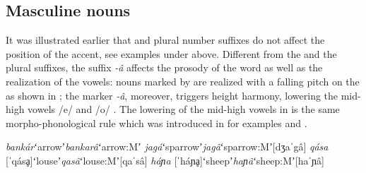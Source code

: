 \documentclass[output=paper]{LSP/langsci}
\begin{document}
\subsection{Masculine nouns} \label{sec:Petrollino:masculinenouns}
It was illustrated earlier that   and plural number suffixes do not affect the position of the accent, see examples under  above. Different from the  and the plural suffixes, the  suffix \textit{-â} affects the prosody of the word as well as the realization of the vowels: nouns marked by   are realized with a falling pitch on the  as shown in ; the   marker \textit{-â}, moreover, triggers height harmony, lowering the mid-high vowels /e/ and /o/ . The lowering of the mid-high vowels in  is the same morpho-phonological rule which was introduced in  for examples  and . 
\begin{exe}
\ex \label{ex:Petrollino:masculine} \begin{xlist}
\ex \textit{bankár}\hspace{10mm}ʻarrowʼ\hspace{10mm}\textit{bankarâ}\hspace{10mm}ʻarrow:Mʼ\label{ex:Petrollino:bankár} 
\ex \textit{jagá}\hspace{15mm}ʻsparrowʼ\hspace{6mm}\textit{jagâ}\hspace{16mm}ʻsparrow:Mʼ\hspace{5mm}[dʒaˈgâ]\label{ex:Petrollino:jagá}
\ex \textit{qása} [ˈqásḁ]\hspace{4mm}ʻlouseʼ\hspace{10mm}\textit{qasâ}\hspace{16mm}ʻlouse:Mʼ\hspace{10mm}[qaˈsâ]\label{ex:Petrollino:qasa}
\ex \textit{háɲa} [ˈháɲḁ]\hspace{3mm}ʻsheepʼ\hspace{9mm}\textit{haɲâ}\hspace{15mm}ʻsheep:Mʼ\hspace{9mm}[haˈɲâ] \label{ex:Petrollino:haɲa}
\end{xlist}
\end{exe}
\end{document}
